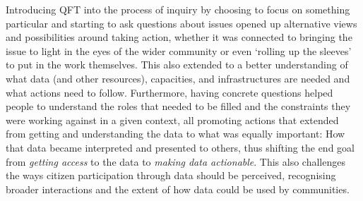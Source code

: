 Introducing QFT into the process of inquiry by choosing to focus on something particular and starting to ask questions about issues opened up alternative views and possibilities around taking action, whether it was connected to bringing the issue to light in the eyes of the wider community or even `rolling up the sleeves' to put in the work themselves. This also extended to a better understanding of what data (and other resources), capacities, and infrastructures are needed and what actions need to follow. Furthermore, having concrete questions helped people to understand the roles that needed to be filled and the constraints they were working against in a given context, all promoting actions that extended from getting and understanding the data to what was equally important: How that data became interpreted and presented to others, thus shifting the end goal from \textit{getting access} to the data to \textit{making data actionable}. This also challenges the ways citizen participation through data should be perceived, recognising broader interactions and the extent of how data could be used by communities.

